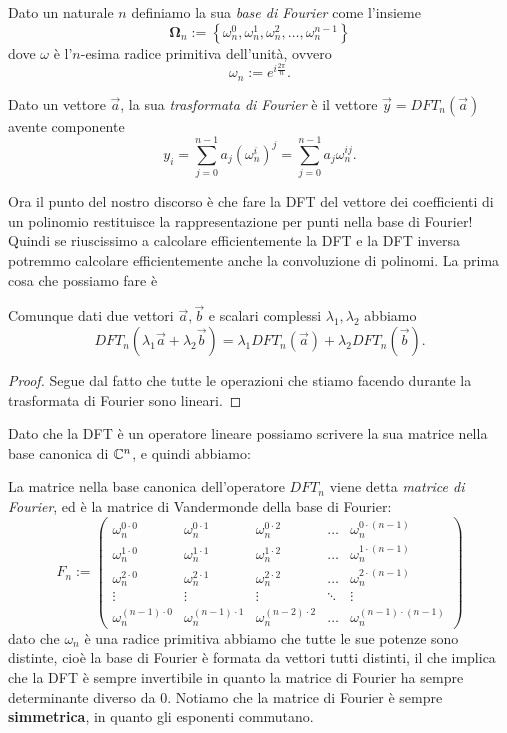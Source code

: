 \documentclass[11pt]{scrartcl}
\begin{document}
	\begin{definition}
		Dato un naturale $n$ definiamo la sua \textit{base di Fourier} come l'insieme
		$$\mathbf{\Omega}_n:=\left\{\omega^0_n,\omega^1_n,\omega^2_n,\dots,\omega^{n-1}_n\right\}$$
		dove $\omega$ è l'$n$-esima radice primitiva dell'unità, ovvero
		$$\omega_n:=e^{i\frac{2\pi }{n}}.$$
	\end{definition}
	\begin{definition}
		Dato un vettore $\vec{a}$, la sua \textit{trasformata di Fourier} è il vettore $\vec{y}=DFT_n(\vec{a})$ avente componente
		$$y_i=\sum_{j=0}^{n-1}a_j\left(\omega^i_n\right)^j=\sum_{j=0}^{n-1}a_j\omega^{ij}_n.$$
	\end{definition}
	Ora il punto del nostro discorso è che fare la DFT del vettore dei coefficienti di un polinomio restituisce la rappresentazione per punti nella base di Fourier! Quindi se riuscissimo a calcolare efficientemente la DFT e la DFT inversa potremmo calcolare efficientemente anche la convoluzione di polinomi. La prima cosa che possiamo fare è
	\begin{lemma}
		Comunque dati due vettori $\vec{a},\vec{b}$ e scalari complessi $\lambda_1,\lambda_2$ abbiamo
		$$DFT_n(\lambda_1\vec{a}+\lambda_2\vec{b})=\lambda_1DFT_n(\vec{a})+\lambda_2DFT_n(\vec{b}).$$
	\end{lemma}
	\begin{proof}
		Segue dal fatto che tutte le operazioni che stiamo facendo durante la trasformata di Fourier sono lineari.
	\end{proof}
	Dato che la DFT è un operatore lineare possiamo scrivere la sua matrice nella base canonica di $\mathbb C^n$, e quindi abbiamo:
	\begin{definition}
		La matrice nella base canonica dell'operatore $DFT_n$ viene detta \textit{matrice di Fourier}, ed è la matrice di Vandermonde della base di Fourier:
		$$F_n:=
		\begin{pmatrix}
			\omega_n^{0\cdot 0} & \omega_n^{0\cdot 1} & \omega_n^{0\cdot 2} & \dots & \omega_n^{0\cdot (n-1)} \\
			\omega_n^{1\cdot 0} & \omega_n^{1\cdot 1} & \omega_n^{1\cdot 2} & \dots & \omega_n^{1\cdot (n-1)} \\ 
			\omega_n^{2\cdot 0} & \omega_n^{2\cdot 1} & \omega_n^{2\cdot 2} & \dots & \omega_n^{2\cdot (n-1)} \\
			\vdots & \vdots & \vdots & \ddots & \vdots \\
			\omega_{n}^{(n-1)\cdot 0} & \omega_{n}^{(n-1)\cdot 1} & \omega_{n}^{(n-2)\cdot 2} & \dots & \omega_{n}^{(n-1)\cdot(n-1)}
		\end{pmatrix}
		$$
		dato che $\omega_n$ è una radice primitiva abbiamo che tutte le sue potenze sono distinte, cioè la base di Fourier è formata da vettori tutti distinti, il che implica che la DFT è sempre invertibile in quanto la matrice di Fourier ha sempre determinante diverso da $0$. Notiamo che la matrice di Fourier è sempre \textbf{simmetrica}, in quanto gli esponenti commutano.
	\end{definition}
	
\end{document}
